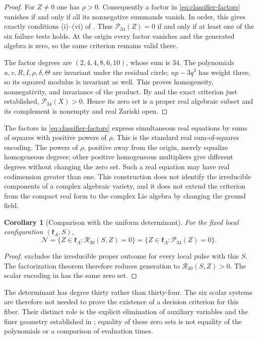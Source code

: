 \documentclass[11pt,a4paper]{article}
\newtheorem{corollary}[corollary]{Corollary}
\begin{document}
\begin{proof}
For $Z\ne0$ one has $\rho>0$.  Consequently a factor in
\eqref{eq:classifier-factors} vanishes if and only if all its nonnegative summands vanish.
In order, this gives exactly conditions (i)--(vi) of .
Thus $\mathcal P_{34}(Z)=0$ if and only if at least one of the six failure tests holds.
At the origin every factor vanishes and the generated algebra is zero, so the same
criterion remains valid there.

The factor degrees are $(2,4,4,8,6,10)$, whose sum is $34$.
The polynomials $u,v,R,I,\rho,\delta,\Theta$ are invariant under the residual circle;
$up-3q^3$ has weight three, so its squared modulus is invariant as well.
This proves homogeneity, nonnegativity, and invariance of the product.
By  and the exact criterion just established,
$\mathcal P_{34}(X)>0$.  Hence its zero set is a proper real algebraic subset
and its complement is nonempty and real Zariski open.
\end{proof}

The factors in \eqref{eq:classifier-factors} express simultaneous real equations by sums of squares with positive powers of $\rho$.  This is the standard real sum-of-squares encoding.  The powers of $\rho$, positive away from the origin, merely equalize homogeneous degrees; other positive homogeneous multipliers give different degrees without changing the zero set.  Such a real equation may have real codimension greater than one.  This construction does not identify the irreducible components of a complex algebraic variety, and it does not extend the criterion from the compact real form to the complex Lie algebra by changing the ground field.

\begin{corollary}[Comparison with the uniform determinant]\label{cor:fixed-R30}
For the fixed local configuration $(\mathfrak k_A,S)$,
\begin{equation}
\mathcal N=\{Z\in\mathfrak k_A:\mathcal R_{30}(S,Z)=0\}
=\{Z\in\mathfrak k_A:\mathcal P_{34}(Z)=0\}.\label{eq:R30-P34}
\end{equation}
\end{corollary}
\begin{proof}
 excludes the irreducible proper outcome for every local pulse with this $S$.
The factorization theorem  therefore reduces generation to $\mathcal R_{30}(S,Z)>0$.
The scalar encoding in  has the same zero set.
\end{proof}
The determinant has degree thirty rather than thirty-four.  The six scalar systems are therefore not needed to prove the existence of a decision criterion for this fiber.  Their distinct role is the explicit elimination of auxiliary variables and the finer geometry established in ; equality of these zero sets is not equality of the polynomials or a comparison of evaluation times.
\end{document}
